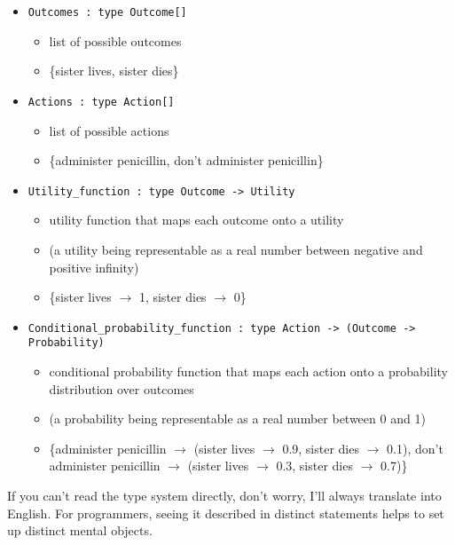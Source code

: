 \begin{itemize}
\item  \texttt{Outcomes : type Outcome[]}
  \begin{itemize}
    \item list of possible outcomes
    \item \{sister lives, sister dies\}
  \end{itemize}

\item \texttt{Actions : type Action[]}
  \begin{itemize}
    \item list of possible actions
    \item \{administer penicillin, don't administer penicillin\}
  \end{itemize}

\item \texttt{Utility\_function : type Outcome -{\textgreater} Utility}
  \begin{itemize}
    \item utility
      function that maps each outcome onto a utility
    \item (a utility being
      representable as a real number between negative and positive infinity)
    \item \{sister lives $\rightarrow $ 1,
      sister dies $\rightarrow $ 0\}
  \end{itemize}

\item \texttt{Conditional\_probability\_function :\newline
  type Action -{\textgreater} (Outcome -{\textgreater} Probability)}
  \begin{itemize}
    \item conditional probability function that maps each action onto a
      probability distribution over outcomes
    \item (a probability being
      representable as a real number between 0 and 1)
    \item \{administer penicillin $\rightarrow
$ (sister lives $\rightarrow $ 0.9, sister dies $\rightarrow $ 0.1),
don't administer penicillin $\rightarrow $ (sister
lives $\rightarrow $ 0.3, sister dies $\rightarrow $
0.7)\}
  \end{itemize}
\end{itemize}

{
 If you can't read the type system directly,
don't worry, I'll always translate into
English. For programmers, seeing it described in distinct statements
helps to set up distinct mental objects.}

